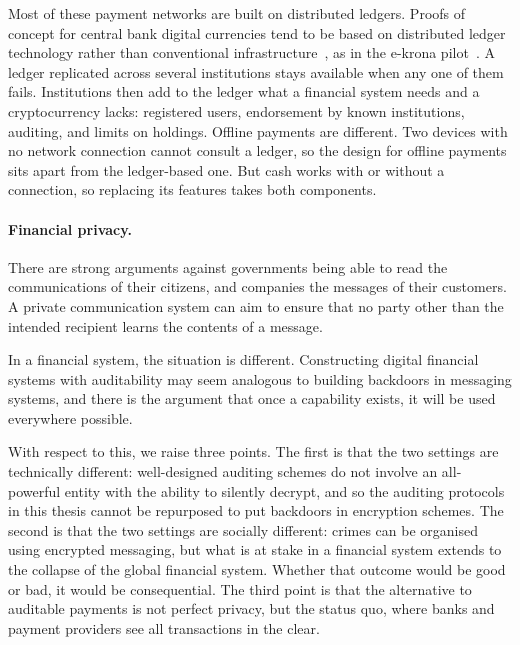 Most of these payment networks are built on distributed ledgers. Proofs of concept
for central bank digital currencies tend to be based on distributed ledger
technology rather than conventional infrastructure~\cite{auer2020rise}, as in
the e-krona pilot~\cite{soderberg2019krona}. A ledger replicated
across several institutions stays available when any one of them fails.
Institutions then add to the ledger what a financial system needs and a cryptocurrency
lacks: registered users, endorsement by known institutions, auditing, and
limits on holdings. Offline payments are different. Two devices with no network
connection cannot consult a ledger, so the design for offline payments sits
apart from the ledger-based one. But cash works with or without a connection, so
replacing its features takes both components.

\paragraph{Financial privacy.} There are strong arguments against governments
being able to read the communications of their citizens, and companies the
messages of their customers. A private communication system can aim to ensure
that no party other than the intended recipient learns the contents of a
message.

In a financial system, the situation is different.  Constructing digital
financial systems with auditability may seem analogous to building backdoors in
messaging systems, and there is the argument that once a capability exists, it
will be used everywhere possible.

With respect to this, we raise three points. The first is that the two settings
are technically different: well-designed auditing schemes do not involve an
all-powerful entity with the ability to silently decrypt, and so the auditing
protocols in this thesis cannot be repurposed to put backdoors in encryption
schemes.  The second is that the two settings are socially different: crimes
can be organised using encrypted messaging, but what is at stake in a financial
system extends to the collapse of the global financial system. Whether that
outcome would be good or bad, it would be consequential. The third point is
that the alternative to auditable payments is not perfect privacy, but the
status quo, where banks and payment providers see all transactions in the
clear.

